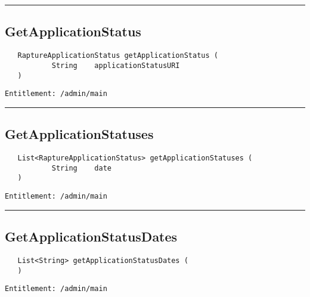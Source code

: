 \rule{12cm}{2pt}
\subsection{GetApplicationStatus}
\label{Api:GetApplicationStatus}
\begin{Verbatim}
   RaptureApplicationStatus getApplicationStatus (
           String    applicationStatusURI
   )
\end{Verbatim}
\begin{Verbatim}[formatcom=\color{Maroon}]
  Entitlement: /admin/main
\end{Verbatim}



\rule{12cm}{2pt}
\subsection{GetApplicationStatuses}
\label{Api:GetApplicationStatuses}
\begin{Verbatim}
   List<RaptureApplicationStatus> getApplicationStatuses (
           String    date
   )
\end{Verbatim}
\begin{Verbatim}[formatcom=\color{Maroon}]
  Entitlement: /admin/main
\end{Verbatim}



\rule{12cm}{2pt}
\subsection{GetApplicationStatusDates}
\label{Api:GetApplicationStatusDates}
\begin{Verbatim}
   List<String> getApplicationStatusDates (
   )
\end{Verbatim}
\begin{Verbatim}[formatcom=\color{Maroon}]
  Entitlement: /admin/main
\end{Verbatim}



